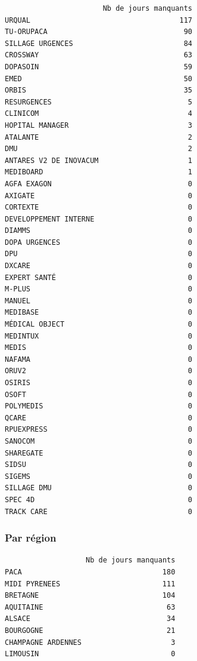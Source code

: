 \documentclass[]{article}
\begin{document}
\begin{verbatim}
                       Nb de jours manquants
URQUAL                                   117
TU-ORUPACA                                90
SILLAGE URGENCES                          84
CROSSWAY                                  63
DOPASOIN                                  59
EMED                                      50
ORBIS                                     35
RESURGENCES                                5
CLINICOM                                   4
HOPITAL MANAGER                            3
ATALANTE                                   2
DMU                                        2
ANTARES V2 DE INOVACUM                     1
MEDIBOARD                                  1
AGFA EXAGON                                0
AXIGATE                                    0
CORTEXTE                                   0
DEVELOPPEMENT INTERNE                      0
DIAMMS                                     0
DOPA URGENCES                              0
DPU                                        0
DXCARE                                     0
EXPERT SANTÉ                               0
M-PLUS                                     0
MANUEL                                     0
MEDIBASE                                   0
MÉDICAL OBJECT                             0
MEDINTUX                                   0
MEDIS                                      0
NAFAMA                                     0
ORUV2                                      0
OSIRIS                                     0
OSOFT                                      0
POLYMEDIS                                  0
QCARE                                      0
RPUEXPRESS                                 0
SANOCOM                                    0
SHAREGATE                                  0
SIDSU                                      0
SIGEMS                                     0
SILLAGE DMU                                0
SPEC 4D                                    0
TRACK CARE                                 0
\end{verbatim}

\subsubsection{Par région}\label{par-region}

\begin{verbatim}
                   Nb de jours manquants
PACA                                 180
MIDI PYRENEES                        111
BRETAGNE                             104
AQUITAINE                             63
ALSACE                                34
BOURGOGNE                             21
CHAMPAGNE ARDENNES                     3
LIMOUSIN                               0
\end{verbatim}
\end{document}
